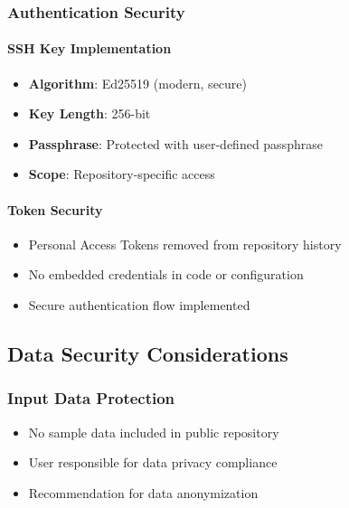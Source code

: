 \documentclass[
  11pt,
]{article}
\providecommand{\tightlist}{%
  \setlength{\itemsep}{0pt}\setlength{\parskip}{0pt}}
\begin{document}
\subsubsection{Authentication Security}\label{authentication-security}

\paragraph{SSH Key Implementation}\label{ssh-key-implementation}

\begin{itemize}
\tightlist
\item
  \textbf{Algorithm}: Ed25519 (modern, secure)
\item
  \textbf{Key Length}: 256-bit
\item
  \textbf{Passphrase}: Protected with user-defined passphrase
\item
  \textbf{Scope}: Repository-specific access
\end{itemize}

\paragraph{Token Security}\label{token-security}

\begin{itemize}
\tightlist
\item
  Personal Access Tokens removed from repository history
\item
  No embedded credentials in code or configuration
\item
  Secure authentication flow implemented
\end{itemize}

\subsection{Data Security
Considerations}\label{data-security-considerations}

\subsubsection{Input Data Protection}\label{input-data-protection}

\begin{itemize}
\tightlist
\item
  No sample data included in public repository
\item
  User responsible for data privacy compliance
\item
  Recommendation for data anonymization
\end{itemize}
\end{document}
